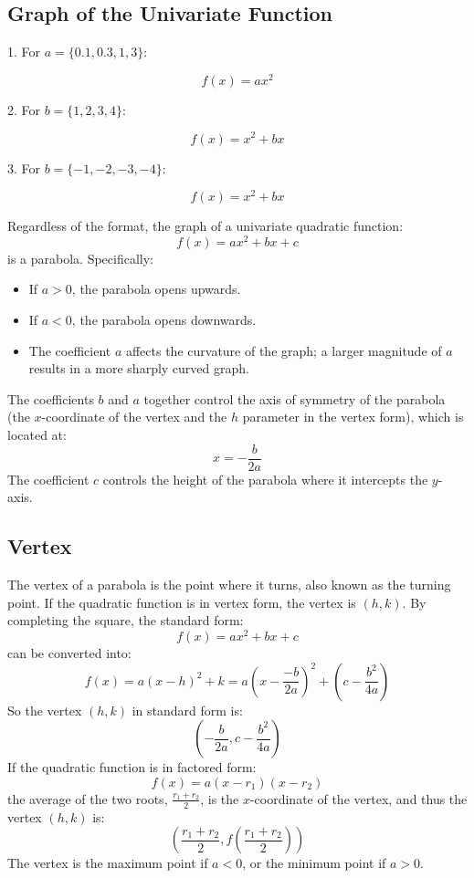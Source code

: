 \subsection{Graph of the Univariate Function}
\label{sss:grap-3928}

1. For $a = \{0.1, 0.3, 1, 3\}$:

   \[
f(x) = ax^2
\]

2. For $b = \{1, 2, 3, 4\}$:

   \[
f(x) = x^2 + bx
\]

3. For $b = \{-1, -2, -3, -4\}$:

   \[
f(x) = x^2 + bx
\]

Regardless of the format, the graph of a univariate quadratic function:
\[
f(x) = ax^2 + bx + c
\]
is a parabola. Specifically:

\begin{itemize}
    \item If $a > 0$, the parabola opens upwards.
    \item If $a < 0$, the parabola opens downwards.
    \item The coefficient $a$ affects the curvature of the graph; a larger magnitude of $a$ results in a more sharply curved graph.
\end{itemize}

The coefficients $b$ and $a$ together control the axis of symmetry of the parabola (the $x$-coordinate of the vertex and the $h$ parameter in the vertex form), which is located at:
\[
x = -\frac{b}{2a}
\]
The coefficient $c$ controls the height of the parabola where it intercepts the $y$-axis.


\subsection{Vertex}
\label{sss:vert-2b5b}

The vertex of a parabola is the point where it turns, also known as the turning point. If the quadratic function is in vertex form, the vertex is $(h, k)$. By completing the square, the standard form:
\[
f(x) = ax^2 + bx + c
\]
can be converted into:
\[
f(x) = a(x - h)^2 + k = a\left(x - \frac{-b}{2a}\right)^2 + \left(c - \frac{b^2}{4a}\right)
\]
So the vertex $(h, k)$ in standard form is:
\[
\left(-\frac{b}{2a}, c - \frac{b^2}{4a}\right)
\]
If the quadratic function is in factored form:
\[
f(x) = a(x - r_1)(x - r_2)
\]
the average of the two roots, $\frac{r_1 + r_2}{2}$, is the $x$-coordinate of the vertex, and thus the vertex $(h, k)$ is:
\[
\left(\frac{r_1 + r_2}{2}, f\left(\frac{r_1 + r_2}{2}\right)\right)
\]
The vertex is the maximum point if $a < 0$, or the minimum point if $a > 0$.

